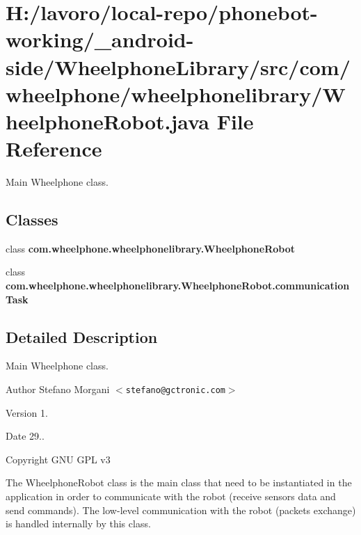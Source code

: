 \section{\-H\-:/lavoro/local-\/repo/phonebot-\/working/\-\_\-android-\/side/\-Wheelphone\-Library/src/com/wheelphone/wheelphonelibrary/\-Wheelphone\-Robot.java \-File \-Reference}
\label{_wheelphone_robot_8java}


\-Main \-Wheelphone class.  


\subsection*{\-Classes}
\begin{DoxyCompactItemize}
\item 
class {\bf com.\-wheelphone.\-wheelphonelibrary.\-Wheelphone\-Robot}
\item 
class {\bfseries com.\-wheelphone.\-wheelphonelibrary.\-Wheelphone\-Robot.\-communication\-Task}
\end{DoxyCompactItemize}


\subsection{\-Detailed \-Description}
\-Main \-Wheelphone class. \begin{DoxyAuthor}{\-Author}
\-Stefano \-Morgani $<${\tt stefano@gctronic.\-com}$>$ 
\end{DoxyAuthor}
\begin{DoxyVersion}{\-Version}
1. 
\end{DoxyVersion}
\begin{DoxyDate}{\-Date}
29.. 
\end{DoxyDate}
\begin{DoxyCopyright}{\-Copyright}
\-G\-N\-U \-G\-P\-L v3
\end{DoxyCopyright}
\-The \-Wheelphone\-Robot class is the main class that need to be instantiated in the application in order to communicate with the robot (receive sensors data and send commands). \-The low-\/level communication with the robot (packets exchange) is handled internally by this class. 